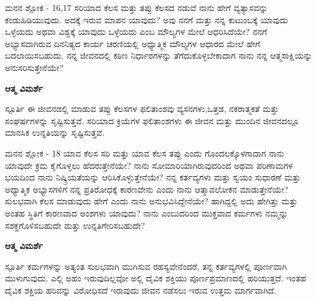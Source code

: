 \newpage
\begin{mananam}{\mananamfont ಮನನ ಶ್ಲೋಕ - \textenglish{16,17}}
\footnotesize \mananamtext ಸರಿಯಾದ ಕೆಲಸ ಮತ್ತು ತಪ್ಪು ಕೆಲಸದ ನಡುವೆ ನಾನು ಹೇಗೆ ವ್ಯತ್ಯಾಸವನ್ನು ಕಂಡುಹಿಡಿಯುವುದು. ಅದಕ್ಕೆ ಇರುವ ಮಾಪನ ಯಾವುದು? ಅವು ನನಗೆ ಮತ್ತು ನನ್ನ ಕುಟುಂಬಕ್ಕೆ ಯಾವುದು ಒಳ್ಳೆಯದು ಅಥವಾ ವಿಶ್ವಕ್ಕೆ ಯಾವುದು ಒಳ್ಳೆಯದು ಎಂಬ ಮೌಲ್ಯಗಳ ಮೇಲೆ ಆಧರಿಸಿದೆಯೇ? ನನಗೆ ಅಭ್ಯಾಸವಾಗಿರುವ ದಿನನಿತ್ಯದ ಕಾರ್ಯ ಚರಣಿಯಲ್ಲಿ ಅಧ್ಯಾತ್ಮಿಕ ಮೌಲ್ಯಗಳ ಆಧಾರದ ಮೇಲೆ ಹೇಗೆ ಬದಲಾಯಿಸಬಹುದು. ನನ್ನ ಜೀವನದಲ್ಲಿ ಕಠಿಣ ನಿರ್ಧಾರಗಳನ್ನು ತೆಗೆದುಕೊಳ್ಳಬೇಕಾದಾಗ ನಾನು ನನ್ನ ಆತ್ಮಸಾಕ್ಷಿಯನ್ನು ಅನುಸರಿಸುತ್ತೇನೆಯೇ?
\end{mananam}
\WritingHand\enspace\textbf{ಆತ್ಮ ವಿಮರ್ಶೆ}\\
\begin{inspiration}{\mananamfont ಸ್ಪೂರ್ತಿ}
\footnotesize \mananamtext ಈ ಜೀವನದಲ್ಲಿ ಮಾಡುವ ತಪ್ಪು ಕೆಲಸಗಳ ಫಲಿತಾಂಶವು ವ್ಯಸನಗಳು,ಒತ್ತಡ, ನಕರಾತ್ಮಕತೆ ಮತ್ತು ಸಂಘರ್ಷಗಳನ್ನು ಸೃಷ್ಟಿಸುತ್ತವೆ. ಸರಿಯಾದ ಕ್ರಿಯೆಗಳ ಫಲಿತಾಂಶಗಳು ಈ ಜೀವನ ಮತ್ತು ಮುಂದಿನ ಜೀವನದಲ್ಲೂ ಮಾನಸಿಕ ಉನ್ನತಿಯನ್ನು ಸೃಷ್ಟಿಸುತ್ತವೆ.
\end{inspiration}
\newpage


\newpage
\begin{mananam}{\mananamfont ಮನನ ಶ್ಲೋಕ - \textenglish{18}}
\footnotesize \mananamtext ಯಾವ ಕೆಲಸ ಸರಿ ಮತ್ತು ಯಾವ ಕೆಲಸ ತಪ್ಪು ಎಂದು ಗೊಂದಲಕ್ಕೊಳಗಾದಾಗ ನಾನು ಯಾವುದೇ ಕ್ರಮ ಕೈಗೊಳ್ಳಲು ಹೆದರುತ್ತೇನೆಯೇ? ನಾನು  ಸೋಮಾರಿಯಾಗಿರುವುದರಿಂದ ಅಥವಾ ಪರಿಣಾಮಗಳ ಭಯದಿಂದ ನಾನು ನಿಷ್ಕ್ರಿಯತೆಯನ್ನು ಆರಿಸಿಕೊಳ್ಳುತ್ತೇನೆಯೇ? ನನ್ನ ಕರ್ತವ್ಯಗಳು ಮತ್ತು ಸ್ವಯಂ ಸುಧಾರಣೆ ಮತ್ತು ಅಧ್ಯಾತ್ಮಿಕ ಅಭ್ಯಾಸಗಳಿಗೆ ನನ್ನ ಪ್ರತಿರೋಧಕ್ಕೆ ಕಾರಣವೇನು ಎಂದು ನಾನು ಆತ್ಮಾವಲೋಕನ ಮಾಡುತ್ತೇನೆಯೇ?\\
 ಸುಲಭವಾಗಿ ಕೆಲಸ ಮಾಡುವುದು ಹೇಗೆ ಎಂದು ನಾನು ಅನುಭವಿಸಿದ್ದೇನೆಯೇ? ಹಾಗಿದ್ದಲ್ಲಿ ಅದು ಹೇಗಿತ್ತು ಮತ್ತು ಅಂತಹ ಸ್ಥಿತಿಗೆ ಕಾರಣವಾದ ಅಂಶಗಳು ಯಾವುದು? ನಾನು ಎಂಬುದರಿಂದ ಮುಕ್ತವಾದ ಕರ್ಮಗಳು ನಮ್ಮನ್ನು ಸಶಕ್ತಗೊಳಿಸಬಹುದೇ ಮತ್ತು ಉನ್ನತಿಗೇರಿಸಬಹುದೇ?
\end{mananam}
\WritingHand\enspace\textbf{ಆತ್ಮ ವಿಮರ್ಶೆ}\\
\begin{inspiration}{\mananamfont ಸ್ಪೂರ್ತಿ}
\footnotesize \mananamtext ಕರ್ಮಗಳನ್ನು ಅತ್ಯಂತ ಸುಲಭವಾಗಿ ಮುಗಿಸುವ ರಹಸ್ಯವೇನೆಂದರೆ, ತನ್ನ ಕರ್ತವ್ಯಗಳಲ್ಲಿ ಪೂರ್ಣವಾಗಿ ಮುಳುಗುವುದು. ಎಲ್ಲಿ ಅಹಂ ಇರುವುದಿಲ್ಲವೋ ಅಲ್ಲಿ ದೈವಿಕ ಶಕ್ತಿಯು ಪೂರ್ಣಪ್ರಮಾಣದಲ್ಲಿ ಹರಿಯುತ್ತದೆ. ಇಂತಹ ದೈವಿಕ ಶಕ್ತಿಯ ಹರಿವನ್ನು ವಿರೋಧಿಸದೆ ಇರುವುದು ಜೀವನ ನಡೆಸಲು ಇರುವ ಉತ್ತಮ ಮಾರ್ಗವಾಗಿದೆ.
\end{inspiration}
\newpage

